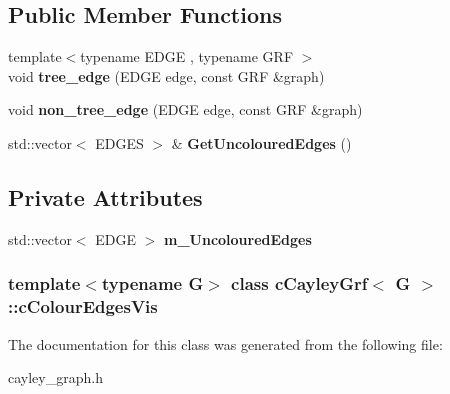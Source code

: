 \subsection*{\-Public \-Member \-Functions}
\begin{DoxyCompactItemize}
\item 
\hypertarget{classcCayleyGrf_1_1cColourEdgesVis_a991cf4a92ed04aeca61cd7e54df835ba}{
{\footnotesize template$<$typename E\-D\-G\-E , typename G\-R\-F $>$ }\\void {\bfseries tree\-\_\-edge} (\-E\-D\-G\-E edge, const \-G\-R\-F \&graph)}
\label{classcCayleyGrf_1_1cColourEdgesVis_a991cf4a92ed04aeca61cd7e54df835ba}

\item 
\hypertarget{classcCayleyGrf_1_1cColourEdgesVis_a2dc8c52e4998bab86d1a7308e85e6998}{
void {\bfseries non\-\_\-tree\-\_\-edge} (\-E\-D\-G\-E edge, const \-G\-R\-F \&graph)}
\label{classcCayleyGrf_1_1cColourEdgesVis_a2dc8c52e4998bab86d1a7308e85e6998}

\item 
\hypertarget{classcCayleyGrf_1_1cColourEdgesVis_ad2637601429bb1e5034bc80e47b0061a}{
std\-::vector$<$ \-E\-D\-G\-E\-S $>$ \& {\bfseries \-Get\-Uncoloured\-Edges} ()}
\label{classcCayleyGrf_1_1cColourEdgesVis_ad2637601429bb1e5034bc80e47b0061a}

\end{DoxyCompactItemize}
\subsection*{\-Private \-Attributes}
\begin{DoxyCompactItemize}
\item 
\hypertarget{classcCayleyGrf_1_1cColourEdgesVis_a5992971a5ac92d6f8006b66d6790990b}{
std\-::vector$<$ \-E\-D\-G\-E $>$ {\bfseries m\-\_\-\-Uncoloured\-Edges}}
\label{classcCayleyGrf_1_1cColourEdgesVis_a5992971a5ac92d6f8006b66d6790990b}

\end{DoxyCompactItemize}
\subsubsection*{template$<$typename G$>$ class c\-Cayley\-Grf$<$ G $>$\-::c\-Colour\-Edges\-Vis}



\-The documentation for this class was generated from the following file\-:\begin{DoxyCompactItemize}
\item 
cayley\-\_\-graph.\-h\end{DoxyCompactItemize}
